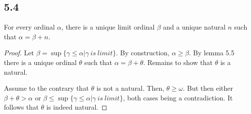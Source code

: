 \subsection*{5.4} For every ordinal $\alpha$, there is a unique limit ordinal $\beta$ and a unique natural $n$ such that $\alpha = \beta + n$.

\begin{proof}
    Let $\beta = \sup\{\gamma \leq \alpha | \gamma~is~limit\}$. By construction, $\alpha \geq \beta$. By lemma 5.5 there is a unique ordinal $\theta$ such that $\alpha = \beta + \theta$. Remains to show that $\theta$ is a natural.

    Assume to the contrary that $\theta$ is not a natural. Then, $\theta \geq \omega$. But then either $\beta + \theta > \alpha$ or $\beta \leq \sup\{\gamma \leq \alpha | \gamma~is~limit\}$, both cases being a contradiction. It follows that $\theta$ is indeed natural.
\end{proof}

